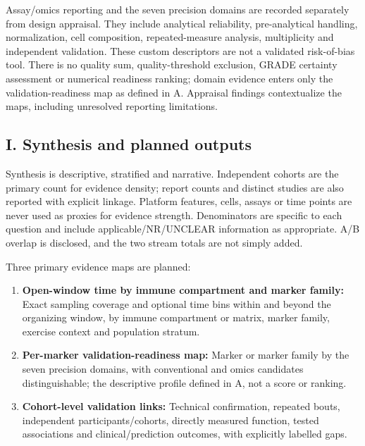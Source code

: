 \documentclass[
  11pt,
  a4paper,
]{article}
\providecommand{\tightlist}{%
  \setlength{\itemsep}{0pt}\setlength{\parskip}{0pt}}
\begin{document}
Assay/omics reporting and the seven precision domains are recorded
separately from design appraisal. They include analytical reliability,
pre-analytical handling, normalization, cell composition,
repeated-measure analysis, multiplicity and independent validation.
These custom descriptors are not a validated risk-of-bias tool. There is
no quality sum, quality-threshold exclusion, GRADE certainty assessment
or numerical readiness ranking; domain evidence enters only the
validation-readiness map as defined in A. Appraisal findings
contextualize the maps, including unresolved reporting limitations.

\subsection{I. Synthesis and planned
outputs}\label{i.-synthesis-and-planned-outputs}

Synthesis is descriptive, stratified and narrative. Independent cohorts
are the primary count for evidence density; report counts and distinct
studies are also reported with explicit linkage. Platform features,
cells, assays or time points are never used as proxies for evidence
strength. Denominators are specific to each question and include
applicable/NR/UNCLEAR information as appropriate. A/B overlap is
disclosed, and the two stream totals are not simply added.

Three primary evidence maps are planned:

\begin{enumerate}
\def\labelenumi{\arabic{enumi}.}
\tightlist
\item
  \textbf{Open-window time by immune compartment and marker family:}
  Exact sampling coverage and optional time bins within and beyond the
  organizing window, by immune compartment or matrix, marker family,
  exercise context and population stratum.
\item
  \textbf{Per-marker validation-readiness map:} Marker or marker family
  by the seven precision domains, with conventional and omics candidates
  distinguishable; the descriptive profile defined in A, not a score or
  ranking.
\item
  \textbf{Cohort-level validation links:} Technical confirmation,
  repeated bouts, independent participants/cohorts, directly measured
  function, tested associations and clinical/prediction outcomes, with
  explicitly labelled gaps.
\end{enumerate}
\end{document}
